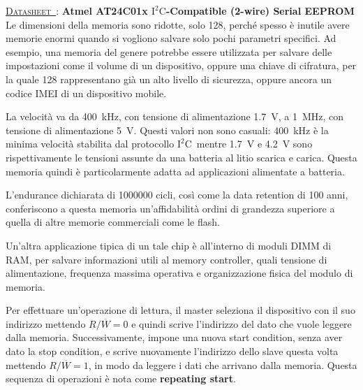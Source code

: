 \documentclass[11pt,4paper]{report}
\newcommand{\iic}{$\text{I}^2\text{C}$}
\newcounter{datasheetcnt}
\renewcommand{\thedatasheetcnt}{\arabic{datasheetcnt}}
\newenvironment{datasheet}[2]{\refstepcounter{datasheetcnt}\par\bigskip\medskip \label{#2}
	\noindent \underline{\textsc{Datasheet~\thedatasheetcnt}}: \textbf{#1} \newline}{\medskip}
\begin{document}
\begin{datasheet}{Atmel AT24C01x \iic-Compatible (2-wire) Serial EEPROM}{ds:atmel_iic}
Le dimensioni della memoria sono ridotte, solo \SI{128}{\byte}, perché spesso è inutile avere memorie enormi quando si vogliono salvare solo pochi parametri specifici. Ad esempio, una memoria del genere potrebbe essere utilizzata per salvare delle impostazioni come il volume di un dispositivo, oppure una chiave di cifratura, per la quale \SI{128}{\byte} rappresentano già un alto livello di sicurezza, oppure ancora un codice IMEI di un dispositivo mobile.

La velocità va da \SI{400}{\kilo\hertz}, con tensione di alimentazione \SI{1.7}{\volt}, a \SI{1}{\mega\hertz}, con tensione di alimentazione \SI{5}{\volt}. Questi valori non sono casuali: \SI{400}{\kilo\hertz} è la minima velocità stabilita dal protocollo \iic\, mentre \SI{1.7}{\volt} e \SI{4.2}{\volt} sono rispettivamente le tensioni assunte da una batteria al litio scarica e carica. Questa memoria quindi è particolarmente adatta ad applicazioni alimentate a batteria.

L'endurance dichiarata di 1000000 cicli, così come la data retention di 100 anni, conferiscono a questa memoria un'affidabilità ordini di grandezza superiore a quella di altre memorie commerciali come le flash.

Un'altra applicazione tipica di un tale chip è all'interno di moduli DIMM di RAM, per salvare informazioni utili al memory controller, quali tensione di alimentazione, frequenza massima operativa e organizzazione fisica del modulo di memoria.

Per effettuare un'operazione di lettura, il master seleziona il dispositivo con il suo indirizzo mettendo $R/\overline{W} = 0$ e quindi scrive l'indirizzo del dato che vuole leggere dalla memoria. Successivamente, impone una  nuova start condition, senza aver dato la stop condition, e scrive nuovamente l'indirizzo dello slave questa volta mettendo $R/\overline{W} = 1$, in modo da leggere i dati che arrivano dalla memoria. Questa sequenza di operazioni è nota come \textbf{repeating start}.
\end{datasheet}
\end{document}
